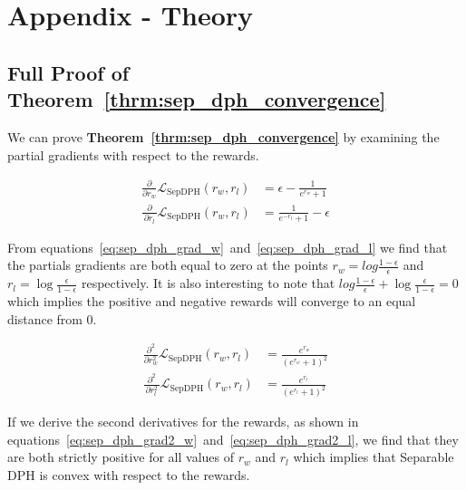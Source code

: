 \newpage
\appendix

\section{Appendix - Theory}

\subsection{Full Proof of Theorem~\ref{thrm:sep_dph_convergence}} \label{sec:sep_dph_proof}

We can prove \textbf{Theorem~\ref{thrm:sep_dph_convergence}} by examining the partial gradients with respect to the rewards.

\begin{subequations} \label{eq:sep_dph_grad}
    \begin{alignat}{2}
    \tfrac{\partial}{\partial r_w} \mathcal{L}_\text{SepDPH}(r_w,r_l) &=
    \epsilon - \frac{1}{e^{r_w}+1} \label{eq:sep_dph_grad_w} \\
    \tfrac{\partial}{\,\partial r_l\,} \mathcal{L}_\text{SepDPH}(r_w,r_l) &=
    \frac{1}{e^{-r_l}+1} - \epsilon \label{eq:sep_dph_grad_l}
    \end{alignat}
\end{subequations}

From equations~\ref{eq:sep_dph_grad_w}~and~\ref{eq:sep_dph_grad_l} we find that the partials gradients are both equal to zero at the points $r_w=log\tfrac{1-\epsilon}{\epsilon}$ and $r_l=\log\tfrac{\epsilon}{1-\epsilon}$ respectively. It is also interesting to note that $log\tfrac{1-\epsilon}{\epsilon}+\log\tfrac{\epsilon}{1-\epsilon}=0$ which implies the positive and negative rewards will converge to an equal distance from 0.

\begin{subequations} \label{eq:sep_dph_grad2}
    \begin{alignat}{2}
    \tfrac{\partial^2}{\partial r_w^2}\mathcal{L}_\text{SepDPH}(r_w,r_l)&=
    \frac{e^{r_w}}{(e^{r_w}+1)^2} \label{eq:sep_dph_grad2_w} \\
    \tfrac{\partial^2}{\,\partial r_l^2\,}\mathcal{L}_\text{SepDPH}(r_w,r_l)&=
    \frac{e^{r_l}}{(e^{r_l}+1)^2} \label{eq:sep_dph_grad2_l}
    \end{alignat}
\end{subequations}

If we derive the second derivatives for the rewards, as shown in equations~\ref{eq:sep_dph_grad2_w}~and~\ref{eq:sep_dph_grad2_l}, we find that they are both strictly positive for all values of $r_w$ and $r_l$ which implies that Separable DPH is convex with respect to the rewards.

